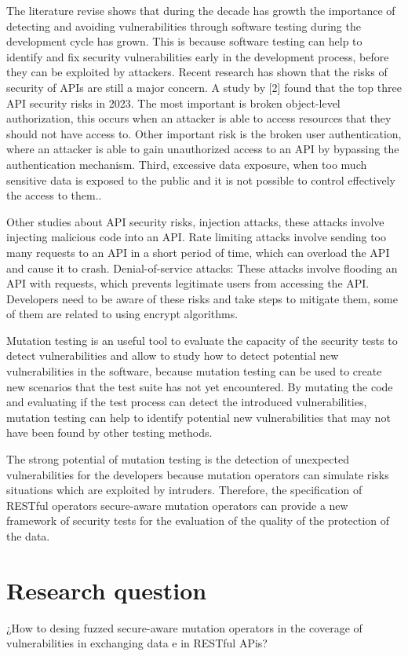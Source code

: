 The literature revise shows that during the decade has growth the importance of detecting and avoiding vulnerabilities through software testing\cite{8564344} during the development cycle has grown.  This is because software testing can help to identify and fix security vulnerabilities early in the development process, before they can be exploited by attackers. Recent research has shown that the risks of security of APIs are still a major concern. A study by [2] found that the top three API security risks in 2023. The most important is broken object-level authorization, this occurs when an attacker is able to access resources that they should not have access to. Other important risk is the broken user authentication, where an attacker is able to gain unauthorized access to an API by bypassing the authentication mechanism. Third, excessive data exposure, when too much sensitive data is exposed to the public and it is not possible to control effectively the access to them..

Other studies about API security risks\cite{zenodo}, injection attacks, these attacks involve injecting malicious code into an API. Rate limiting attacks involve sending too many requests to an API in a short period of time, which can overload the API and cause it to crash. Denial-of-service attacks: These attacks involve flooding an API with requests, which prevents legitimate users from accessing the API. Developers need to be aware of these risks and take steps to mitigate them, some of them are related to using encrypt algorithms.

Mutation testing is an useful tool to evaluate the capacity of the security tests to detect vulnerabilities and allow to study how to detect potential new vulnerabilities in the software, because mutation testing can be used to create new scenarios that the test suite has not yet encountered. By mutating the code and evaluating if the test process can detect the introduced vulnerabilities, mutation testing can help to identify potential new vulnerabilities that may not have been found by other testing methods.

The strong potential of mutation testing is the detection of unexpected vulnerabilities for the developers because mutation operators can simulate risks situations which are exploited by intruders. Therefore, the specification of RESTful operators secure-aware mutation operators can provide a new framework of security tests for the evaluation of the quality of the protection of the data.

\section{Research question}

¿How to desing fuzzed secure-aware mutation operators in the coverage of vulnerabilities in exchanging data e in RESTful APis?
